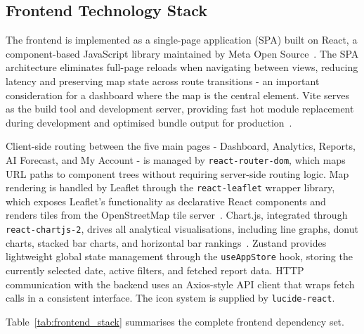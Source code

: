 \documentclass[12pt,a4paper]{report}
\begin{document}
\subsection{Frontend Technology Stack}

The frontend is implemented as a single-page application (SPA) built on React, a component-based JavaScript library maintained by Meta Open Source~\cite{react2024}. The SPA architecture eliminates full-page reloads when navigating between views, reducing latency and preserving map state across route transitions - an important consideration for a dashboard where the map is the central element. Vite serves as the build tool and development server, providing fast hot module replacement during development and optimised bundle output for production~\cite{vitejs2024}.

Client-side routing between the five main pages - Dashboard, Analytics, Reports, AI Forecast, and My Account - is managed by \texttt{react-router-dom}, which maps URL paths to component trees without requiring server-side routing logic. Map rendering is handled by Leaflet through the \texttt{react-leaflet} wrapper library, which exposes Leaflet's functionality as declarative React components and renders tiles from the OpenStreetMap tile server~\cite{leaflet2024, osm2024}. Chart.js, integrated through \texttt{react-chartjs-2}, drives all analytical visualisations, including line graphs, donut charts, stacked bar charts, and horizontal bar rankings~\cite{chartjs2024}. Zustand provides lightweight global state management through the \texttt{useAppStore} hook, storing the currently selected date, active filters, and fetched report data. HTTP communication with the backend uses an Axios-style API client that wraps fetch calls in a consistent interface. The icon system is supplied by \texttt{lucide-react}.

Table~\ref{tab:frontend_stack} summarises the complete frontend dependency set.

\renewcommand{\arraystretch}{1.4}
\end{document}
